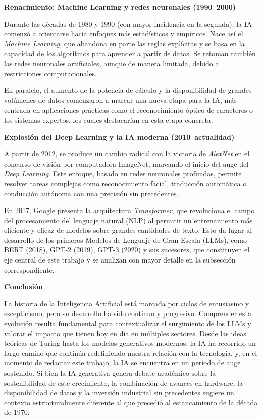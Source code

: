 \vspace{0.3cm}
\textbf{Renacimiento: Machine Learning y redes neuronales (1990–2000)}

Durante las décadas de 1980 y 1990 (con mayor incidencia en la segunda), la IA comenzó a orientarse hacia enfoques más estadísticos y empíricos. Nace así el \textit{Machine Learning}, que abandona en parte las reglas explícitas y se basa en la capacidad de los algoritmos para aprender a partir de datos. Se retoman también las redes neuronales artificiales, aunque de manera limitada, debido a restricciones computacionales.

En paralelo, el aumento de la potencia de cálculo y la disponibilidad de grandes volúmenes de datos comenzaron a marcar una nueva etapa para la IA, más centrada en aplicaciones prácticas como el reconocimiento óptico de caracteres o los sistemas expertos, los cuales destacarían en esta etapa concreta.

\vspace{0.3cm}
\textbf{Explosión del Deep Learning y la IA moderna (2010–actualidad)}

A partir de 2012, se produce un cambio radical con la victoria de \textit{AlexNet} en el concurso de visión por computadora ImageNet, marcando el inicio del auge del \textit{Deep Learning}. Este enfoque, basado en redes neuronales profundas, permite resolver tareas complejas como reconocimiento facial, traducción automática o conducción autónoma con una precisión sin precedentes.

En 2017, Google presenta la arquitectura \textit{Transformer}, que revoluciona el campo del procesamiento del lenguaje natural (NLP) al permitir un entrenamiento más eficiente y eficaz de modelos sobre grandes cantidades de texto. Esto da lugar al desarrollo de los primeros Modelos de Lenguaje de Gran Escala (LLMs), como BERT (2018), GPT-2 (2019), GPT-3 (2020) y sus sucesores, que constituyen el eje central de este trabajo y se analizan con mayor detalle en la subsección correspondiente.

\vspace{0.3cm}
\textbf{Conclusión}

La historia de la Inteligencia Artificial está marcada por ciclos de entusiasmo y escepticismo, pero su desarrollo ha sido continuo y progresivo. Comprender esta evolución resulta fundamental para contextualizar el surgimiento de los LLMs y valorar el impacto que tienen hoy en día en múltiples sectores. Desde las ideas teóricas de Turing hasta los modelos generativos modernos, la IA ha recorrido un largo camino que continúa redefiniendo nuestra relación con la tecnología, y, en el momento de redactar este trabajo, la IA se encuentra en un período de auge sostenido. Si bien la IA generativa genera debate académico sobre la sostenibilidad de este crecimiento, la combinación de avances en hardware, la disponibilidad de datos y la inversión industrial sin precedentes sugiere un contexto estructuralmente diferente al que precedió al estancamiento de la década de 1970.

